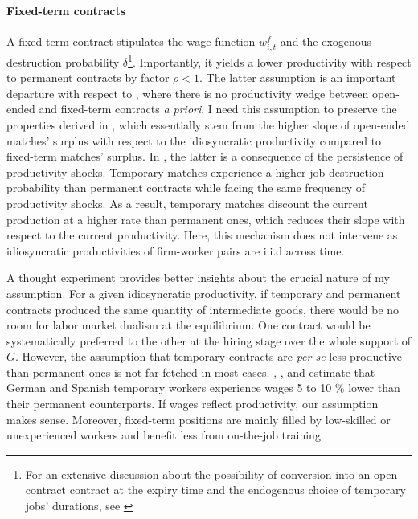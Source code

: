 \paragraph{Fixed-term contracts} A fixed-term contract stipulates the wage function $w_{i,t}^{f}$ and the exogenous destruction probability $\delta$\footnote{For an extensive discussion about the possibility of conversion into an open-contract contract at the expiry time and the endogenous choice of temporary jobs' durations, see \citet{rion:halshs-02331887}}. Importantly, it yields a lower productivity with respect to permanent contracts by factor $\rho < 1$. The latter assumption is an important departure with respect to \citet{rion:halshs-02331887}, where there is no productivity wedge between open-ended and fixed-term contracts \emph{a priori}. I need this assumption to preserve the properties derived in \citet{rion:halshs-02331887}, which essentially stem from the higher slope of open-ended matches' surplus with respect to the idiosyncratic productivity compared to fixed-term matches' surplus. In \citet{rion:halshs-02331887}, the latter is a consequence of the persistence of productivity shocks. Temporary matches experience a higher job destruction probability than permanent contracts while facing the same frequency of productivity shocks. As a result, temporary matches discount the current production at a higher rate than permanent ones, which reduces their slope with respect to the current productivity. Here, this mechanism does not intervene as idiosyncratic productivities of firm-worker pairs are i.i.d across time. 

A thought experiment provides better insights about the crucial nature of my assumption. For a given idiosyncratic productivity, if temporary and permanent contracts produced the same quantity of intermediate goods, there would be no room for labor market dualism at the equilibrium. One contract would be systematically preferred to the other at the hiring stage over the whole support of $G$. However, the assumption that temporary contracts are \emph{per se} less productive than permanent ones is not far-fetched in most cases. \citet{doi:10.1111/1467-9914.00212}, \citet{doi:10.1111/j.1467-9914.2007.00396.x}, \citet{Pfeifer2012} and \citet{Pfeifer2014} estimate that German and Spanish temporary workers experience wages 5 to 10 \% lower than their permanent counterparts. If wages reflect productivity, our assumption makes sense. Moreover, fixed-term positions are mainly filled by low-skilled or unexperienced workers \citep{fontaine2016cdd} and benefit less from on-the-job training \citep{doi:10.1111/1467-8543.00106,10.1162/154247604323068041,Albert2005,10.1093/esr/jcs011}. 

